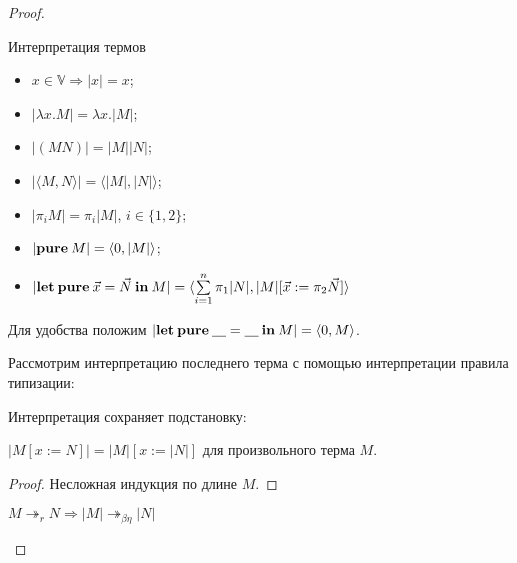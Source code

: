 \begin{proof}
\begin{defin} Интерпретация термов
  \begin{itemize}
    \item $x \in \mathbb{V} \Rightarrow |x| = x$;
    \item $|\lambda x. M| = \lambda x. |M|$;
    \item $|(M N)| = |M| |N|$;
    \item $|\langle M, N \rangle| = \langle |M|, |N| \rangle$;
    \item $|\pi_i M| = \pi_i |M|$, $i \in \{ 1, 2\}$;
    \item $|{\bf pure \:} M| = \langle 0, |M| \rangle$;
    \item $|{\bf let \: pure \:} \vec{x} = \vec{N} {\: \bf in \:} M| = \langle \sum \limits_{i = 1}^n \pi_1 |N|, |M| [\vec{x} := \pi_2 \vec{N}] \rangle$
  \end{itemize}
\end{defin}

Для удобства положим $|{\bf let \: pure \:} \underline{\quad} = \underline{\quad} {\: \bf in \:} M| = \langle 0, M \rangle$.

Рассмотрим интерпретацию последнего терма с помощью интерпретации правила типизации:


\begin{prooftree}
\end{prooftree}

\begin{lemma} Интерпретация сохраняет подстановку:

  $|M [x := N]| = |M| [x := |N|]$ для произвольного терма $M$.
\end{lemma}

\begin{proof}

  Несложная индукция по длине $M$.
\end{proof}

\begin{lemma}

  $M \twoheadrightarrow_{r} N \Rightarrow |M| \twoheadrightarrow_{\beta\eta} |N|$
\end{lemma}


\end{proof}
